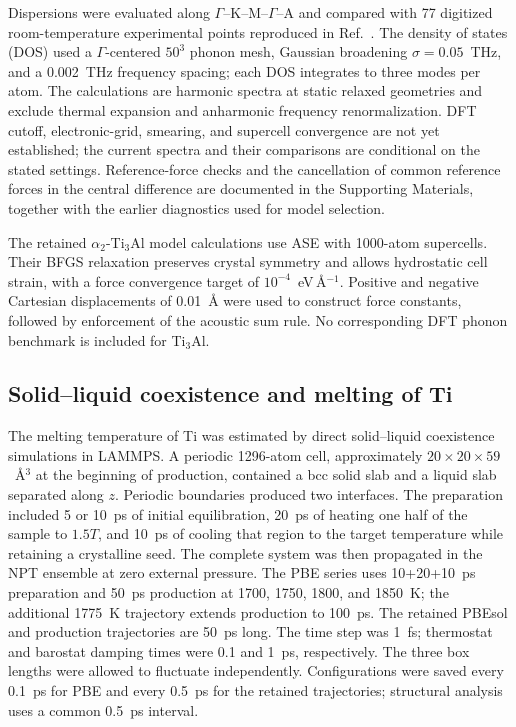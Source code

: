 Dispersions were evaluated along $\Gamma$--K--M--$\Gamma$--A and compared with 77 digitized room-temperature experimental points reproduced in Ref.~.
The density of states (DOS) used a $\Gamma$-centered $50^3$ phonon mesh, Gaussian broadening $\sigma=0.05$~THz, and a 0.002~THz frequency spacing; each DOS integrates to three modes per atom.
The calculations are harmonic spectra at static relaxed geometries and exclude thermal expansion and anharmonic frequency renormalization.
DFT cutoff, electronic-grid, smearing, and supercell convergence are not yet established; the current spectra and their comparisons are conditional on the stated settings.
Reference-force checks and the cancellation of common reference forces in the central difference are documented in the Supporting Materials, together with the earlier diagnostics used for model selection.

The retained $\alpha_2$-Ti$_3$Al model calculations use ASE with 1000-atom supercells.
Their BFGS relaxation preserves crystal symmetry and allows hydrostatic cell strain, with a force convergence target of $10^{-4}$~eV\,\AA$^{-1}$.
Positive and negative Cartesian displacements of 0.01~\AA{} were used to construct force constants, followed by enforcement of the acoustic sum rule.
No corresponding DFT phonon benchmark is included for Ti$_3$Al.

\subsection{Solid--liquid coexistence and melting of Ti}
\label{sec:melting}

The melting temperature of Ti was estimated by direct solid--liquid coexistence simulations in LAMMPS.\cite{Thompson2022}
A periodic 1296-atom cell, approximately $20\times20\times59$~\AA$^3$ at the beginning of production, contained a bcc solid slab and a liquid slab separated along $z$.
Periodic boundaries produced two interfaces.
The preparation included 5 or 10~ps of initial equilibration, 20~ps of heating one half of the sample to $1.5T$, and 10~ps of cooling that region to the target temperature while retaining a crystalline seed.
The complete system was then propagated in the NPT ensemble at zero external pressure.
The PBE series uses 10+20+10~ps preparation and 50~ps production at 1700, 1750, 1800, and 1850~K; the additional 1775~K trajectory extends production to 100~ps.
The retained PBEsol and \rscan{} production trajectories are 50~ps long.
The time step was 1~fs; thermostat and barostat damping times were 0.1 and 1~ps, respectively.
The three box lengths were allowed to fluctuate independently.
Configurations were saved every 0.1~ps for PBE and every 0.5~ps for the retained trajectories; structural analysis uses a common 0.5~ps interval.


